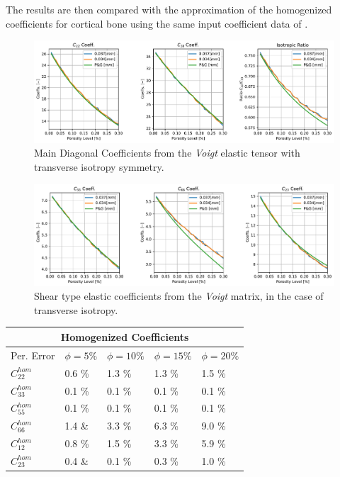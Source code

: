 The results are then compared with the approximation of the homogenized coefficients for cortical bone using the same input coefficient data of \cite{Parnell2008}.

\begin{figure}[!h]
	\centering
	\includegraphics[scale=.5]{images/CellsProb/CellProb_MainHomCoeffsCircular.pdf}
	\caption{Main Diagonal Coefficients from the \textit{Voigt} elastic tensor with transverse isotropy symmetry.}
	\label{MainHomCoeffs}
\end{figure}

\begin{figure}[!h]
	\centering
	\includegraphics[scale=.5]{images/CellsProb/CellProb_OthersHomCoeffsCircular.pdf}
	\caption{Shear type elastic coefficients from the \textit{Voigt} matrix, in the case of transverse isotropy.}
	\label{OtherHomCoeffs}
\end{figure}

\begin{center}
\begin{tabular}{ |p{2.5cm}||p{2cm}|p{2cm}|p{2cm}|p{2cm}| }
 \hline
 \multicolumn{5}{|c|}{Homogenized Coefficients} \\
 \hline
 Per. Error & $\phi = 5 \%$ & $\phi = 10 \%$ & $\phi = 15 \%$ & $\phi = 20 \%$ \\
 \hline
 $C^{hom}_{22}$ & 0.6 \% & 1.3 \% & 1.3 \% & 1.5 \% \\
 $C^{hom}_{33}$ & 0.1 \% & 0.1 \% & 0.1 \% & 0.1 \% \\
 $C^{hom}_{55}$ & 0.1 \% & 0.1 \% & 0.1 \% & 0.1 \% \\
 $C^{hom}_{66}$ & 1.4 \& & 3.3 \% & 6.3 \% & 9.0 \% \\
 $C^{hom}_{12}$ & 0.8 \% & 1.5 \% & 3.3 \% & 5.9 \% \\
 $C^{hom}_{23}$ & 0.4 \& & 0.1 \% & 0.3 \% & 1.0 \% \\
 \hline
\end{tabular}
\end{center}

